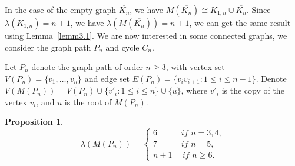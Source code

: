 \documentclass{article}
\newtheorem{prop} {Proposition}
\newtheorem{open problem} {Open Problem}
\numberwithin{lemma}{section}
\numberwithin{theorem}{section}
\numberwithin{cor}{section}
\numberwithin{prop}{section}
\numberwithin{con}{section}
\numberwithin{claim}{section}
\numberwithin{obs}{section}
\numberwithin{dnt}{section}
\begin{document}
\par In the case of the empty graph $\overline{K_n}$, we have $M(\overline{K_n})\cong K_{1,n}\cup \overline{K_n} $. Since $\lambda(K_{1,n})=n+1$, we have $\lambda (M(\overline{K_n}))=n+1$, we can get the same result using Lemma~\ref{lemm3.1}. We are now interested in some connected graphs, we consider the graph path $P_n$ and cycle $C_n$.
\par Let $P_n$ denote the graph path of order $n\geq 3$, with vertex set $V(P_n)=\{v_1,\ldots,v_n\}$ and edge set $E(P_n)=\{v_iv_{i+1}:1\leq i\leq n-1\}$. Denote $V(M( P_n))= V(P_n)\cup  \{v'_i : 1\leq i \leq n\} \cup \{u\}$, where $v'_i$ is the copy of the vertex $v_i$, and $u$ is the root of $M( P_n)$. 
\begin{prop}\label{th3.6}
	$$\lambda(M(P_n))=\begin{cases} 
	6 \hspace{35pt}if\,\, n=3,4, \\
	7 \hspace{35pt}if\,\, n=5, \\
	n+1 \hspace{15pt}if\,\,n \geq 6.
	\end{cases} 	$$
\end{prop}
\end{document}
